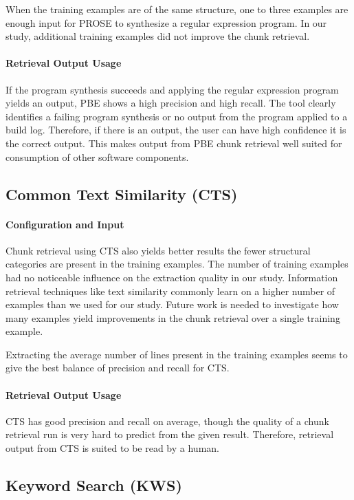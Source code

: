 \documentclass[\myrootdir/main.tex]{subfiles}
\begin{document}
When the training examples are of the same structure, one to three examples are enough input for PROSE to synthesize a regular expression program.
In our study, additional training examples did not improve the chunk retrieval.

\paragraph{Retrieval Output Usage}
If the program synthesis succeeds and applying the regular expression program yields an output, PBE shows a high precision and high recall.
The tool clearly identifies a failing program synthesis or no output from the program applied to a build log.
Therefore, if there is an output, the user can have high confidence it is the correct output.
This makes output from PBE chunk retrieval well suited for consumption of other software components.

\subsection{Common Text Similarity (CTS)}
\paragraph{Configuration and Input}
Chunk retrieval using CTS also yields better results the fewer structural categories are present in the training examples.
The number of training examples had no noticeable influence on the extraction quality in our study.
Information retrieval techniques like text similarity commonly learn on a higher number of examples than we used for our study.
Future work is needed to investigate how many examples yield improvements in the chunk retrieval over a single training example.

Extracting the average number of lines present in the training examples seems to give the best balance of precision and recall for CTS\@.

\paragraph{Retrieval Output Usage}
CTS has good precision and recall on average, though the quality of a chunk retrieval run is very hard to predict from the given result.
Therefore, retrieval output from CTS is suited to be read by a human.

\subsection{Keyword Search (KWS)}
\end{document}
